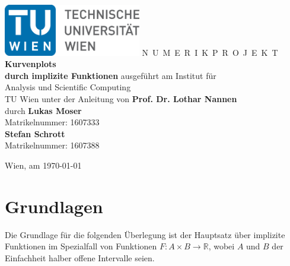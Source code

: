 \documentclass[a4paper,11pt,bibliography=totoc,listof=totoc,headinclude=true,cleardoublepage=empty,oneside]{scrartcl}
\newcommand{\R}{\mathbb{R}}
\newcounter{satz}
\begin{document}



\begin{titlepage}
  \begin{center}
    \includegraphics[width=0.45\textwidth]{TULogo.eps}
    \vskip 1cm%
    {\LARGE N~\Large U~M~E~R~I~K~P~R~O~J~E~K~T}
    \vskip 8mm
    {\huge\bfseries Kurvenplots\\durch implizite Funktionen}
    \vskip 1cm
    \large 
    ausgef\"uhrt am    
    \vskip 0.75cm
    {\Large Institut f\"ur\\[1ex] Analysis und Scientific Computing}\\[1ex]
    {\Large TU Wien}
    \vskip0.75cm
    unter der Anleitung von
    \vskip0.75cm
    {\Large\bfseries Prof. Dr. Lothar Nannen}\\[1ex]
    \vskip 0.5cm
    durch
    \vskip 0.5cm
    {\Large\bfseries Lukas Moser }\\[1ex]
    Matrikelnummer: {1607333}\\[1ex]
    {\Large\bfseries Stefan Schrott}\\[1ex]
    Matrikelnummer: {1607388}\\[1ex]
   
  \end{center}
  
  \vfill
  
  \small
  Wien, am \today
  \vspace*{-15mm}
\end{titlepage}

\cleardoublepage



\tableofcontents

\cleardoublepage
{} 


\section{Grundlagen}
Die Grundlage für die folgenden Überlegung ist der Hauptsatz über implizite Funktionen im Spezialfall von Funktionen $F: A \times B \to \R$, wobei $A$ und $B$ der Einfachheit halber offene Intervalle seien.
\end{document}
